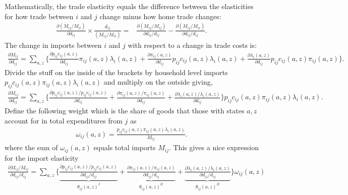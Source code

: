 \documentclass[12pt,pdftex]{article}
\begin{document}
\begin{onehalfspacing}
Mathematically, the trade elasticity equals the difference between the elasticities for how trade between $i$ and $j$ change minus how home trade changes:
\begin{align}
\frac{\partial ( M_{ij} / M_{ii} )}{\partial d_{ij}} \times \frac{d_{ij}}{( M_{ij} / M_{ii} )} =& \frac{\partial ( M_{ij} / M_{ij} )}{\partial d_{ij} / d_{ij}}  - \frac{\partial ( M_{ij} / M_{ii} )}{\partial d_{ij} / d_{ij}}.
\label{eq:def_trade_elasticity}
\end{align}
The change in imports between $i$ and $j$ with respect to a change in trade costs is:
\begin{align}
\frac{\partial  M_{ij}}{\partial d_{ij}} = \sum_{a,z} \bigg \{ \frac{\partial p_{ij}c_{ij}(a,z)}{\partial d_{ij}} \pi_{ij}(a,z)\lambda_{i}(a,z) +
 \frac{\partial \pi_{ij}(a,z)}{\partial d_{ij}} p_{ij}c_{ij}(a,z)\lambda_{i}(a,z)  +
\frac{\partial \lambda_{i}(a,z)}{\partial d_{ij}} p_{ij}c_{ij}(a,z)\pi_{ij}(a,z) \bigg \}.
\end{align}
Divide the stuff on the inside of the brackets by household level imports $p_{ij}c_{ij}(a,z)\pi_{ij}(a,z) \lambda_{i}(a,z)$ and multiply on the outside giving,
\begin{align}
\frac{\partial  M_{ij}}{\partial d_{ij}} = \sum_{a,z} \bigg \{ \frac{\partial p_{ij}c_{ij}(a,z)/ p_{ij}c_{ij}(a,z)}{\partial d_{ij}} +
 \frac{\partial \pi_{ij}(a,z) / \pi_{ij}(a,z)}{\partial d_{ij}}  +
\frac{\partial \lambda_{i}(a,z) / \lambda_{i}(a,z)}{\partial d_{ij}} \bigg \} p_{ij}c_{ij}(a,z)\pi_{ij}(a,z) \lambda_{i}(a,z).
\end{align}
Define the following weight which is the share of goods that those with states $a,z$ account for in total expenditures from $j$ as
\begin{align}
\omega_{ij}(a,z) = \frac{p_{ij}c_{ij}(a,z)\pi_{ij}(a,z) \lambda_{i}(a,z)}{M_{ij}}.
\end{align}
where the sum of $\omega_{ij}(a,z)$ equals total imports $M_{ij}$. This gives a nice expression for the import elasticity
\begin{align}
\frac{\partial  M_{ij} / M_{ij}}{\partial d_{ij} / d_{ij}} = \sum_{a,z} \bigg \{ \underbrace{ \frac{\partial p_{ij}c_{ij}(a,z)/ p_{ij}c_{ij}(a,z)}{\partial d_{ij} / d_{ij}} }_{\theta_{ij}(a,z)^{I}}+
\underbrace{\frac{\partial \pi_{ij}(a,z) / \pi_{ij}(a,z)}{\partial d_{ij} / d_{ij}} }_{\theta_{ij}(a,z)^{E}} +
\underbrace{\frac{\partial \lambda_{i}(a,z) / \lambda_{i}(a,z)}{\partial d_{ij} / d_{ij}}}_{\theta_{ij}(a,z)^{D}} \bigg \} \omega_{ij}(a,z)
\end{align}

\end{onehalfspacing}
\end{document}
